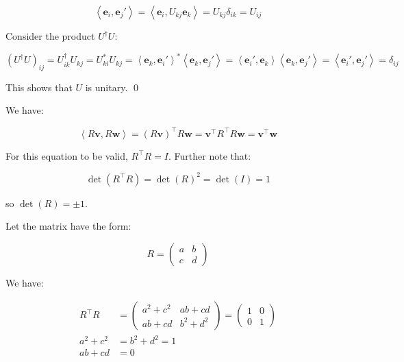 \documentclass[12pt]{article}
\begin{document}

\begin{equation}
    \left\langle \mathbf{e}_{i}, \mathbf{e}_{j}' \right\rangle = \left\langle \mathbf{e}_{i}, U_{kj}\mathbf{e}_{k} \right\rangle = U_{kj} \delta_{ik} = U_{ij}
\end{equation}

Consider the product $U^{\dagger} U$:

\begin{equation}
    \left( U^{\dagger} U \right)_{ij} = U_{ik}^{\dagger} U_{kj} = U_{ki}^{*} U_{kj} = \left\langle \mathbf{e}_{k}, \mathbf{e}_{i}' \right\rangle^{*} \left\langle \mathbf{e}_{k}, \mathbf{e}_{j}' \right\rangle = \left\langle \mathbf{e}_{i}', \mathbf{e}_{k} \right\rangle \left\langle \mathbf{e}_{k}, \mathbf{e}_{j}' \right\rangle = \left\langle \mathbf{e}_{i}', \mathbf{e}_{j}' \right\rangle = \delta_{ij}
\end{equation}

This shows that $U$ is unitary.
\qed



We have:

\begin{equation}
    \left\langle R \mathbf{v}, R \mathbf{w} \right\rangle = (R \mathbf{v})^{\intercal} R \mathbf{w} = \mathbf{v}^{\intercal} R^{\intercal} R \mathbf{w} = \mathbf{v}^{\intercal} \mathbf{w}
\end{equation}

For this equation to be valid, $R^{\intercal} R = I$. Further note that:

\begin{equation}
    \det(R^{\intercal} R) = \det(R)^{2} = \det(I) = 1
\end{equation}

so $\det(R) = \pm 1$.


Let the matrix have the form:

\begin{equation}
    R = \begin{pmatrix}
        a & b \\
        c & d
    \end{pmatrix}
\end{equation}

We have:

\begin{equation}
    \begin{split}
        R^{\intercal}R
        &=
        \begin{pmatrix}
            a^{2} + c^{2} & ab + cd       \\
            ab + cd       & b^{2} + d^{2}
        \end{pmatrix}
        =
        \begin{pmatrix}
            1 & 0 \\
            0 & 1
        \end{pmatrix} \\
        a^{2} + c^{2} &= b^{2} + d^{2} = 1 \\
        ab + cd &= 0
    \end{split}
\end{equation}
\end{document}
